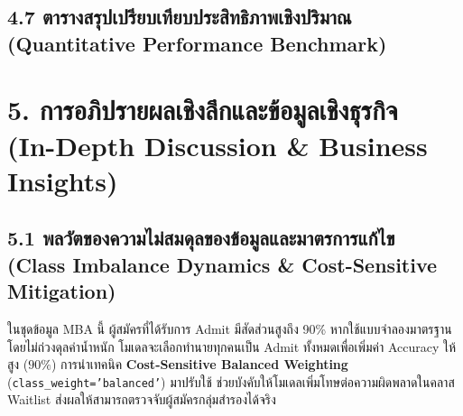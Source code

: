 \documentclass[12pt,a4paper]{article}
\begin{document}
\clearpage
\subsection*{4.7 ตารางสรุปเปรียบเทียบประสิทธิภาพเชิงปริมาณ\\ \normalsize(Quantitative Performance Benchmark)}

\begin{table}[H]
\centering
\caption{ตารางสรุปผลการทดลองเปรียบเทียบประสิทธิภาพแบบจำลองทั้ง 3 สถาปัตยกรรม}
\end{table}

\section*{5. การอภิปรายผลเชิงลึกและข้อมูลเชิงธุรกิจ\\ \large(In-Depth Discussion \& Business Insights)}

\subsection*{5.1 พลวัตของความไม่สมดุลของข้อมูลและมาตรการแก้ไข\\ \normalsize(Class Imbalance Dynamics \& Cost-Sensitive Mitigation)}
ในชุดข้อมูล MBA นี้ ผู้สมัครที่ได้รับการ Admit มีสัดส่วนสูงถึง 90\% หากใช้แบบจำลองมาตรฐานโดยไม่ถ่วงดุลค่าน้ำหนัก โมเดลจะเลือกทำนายทุกคนเป็น Admit ทั้งหมดเพื่อเพิ่มค่า Accuracy ให้สูง ($90\%$) การนำเทคนิค \textbf{Cost-Sensitive Balanced Weighting} (\texttt{class\_weight='balanced'}) มาปรับใช้ ช่วยบังคับให้โมเดลเพิ่มโทษต่อความผิดพลาดในคลาส Waitlist ส่งผลให้สามารถตรวจจับผู้สมัครกลุ่มสำรองได้จริง
\end{document}
